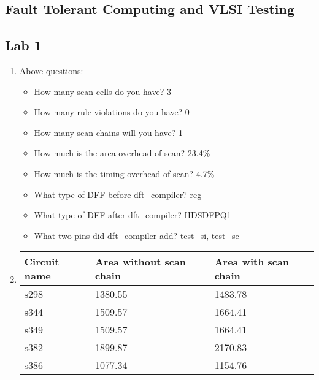\documentclass[a4paper,12pt]{article}
\begin{document}
    \begin{center}
        \section*{Fault Tolerant Computing and VLSI Testing}
        \subsection*{Lab 1}
    \end{center}

    \begin{enumerate}

        \item Above questions:

            \begin{itemize}
                \item How many scan cells do you have? 3
                \item How many rule violations do you have? 0
                \item How many scan chains will you have? 1
                \item How much is the area overhead of scan? 23.4\%
                \item How much is the timing overhead of scan? 4.7\%
                \item What type of DFF before dft\_compiler? reg
                \item What type of DFF after dft\_compiler? HDSDFPQ1
                \item What two pins did dft\_compiler add? test\_si, test\_se
            \end{itemize}

        \item \begin{tabularx}{\textwidth}{|X|X|X|}
                \hline
                Circuit name & Area without scan chain & Area with scan chain \\ \hline
                s298 & 1380.55 & 1483.78 \\ \hline
                s344 & 1509.57 & 1664.41 \\ \hline
                s349 & 1509.57 & 1664.41 \\ \hline
                s382 & 1899.87 & 2170.83 \\ \hline
                s386 & 1077.34 & 1154.76 \\ \hline
            \end{tabularx}


\end{enumerate}
\end{document}
